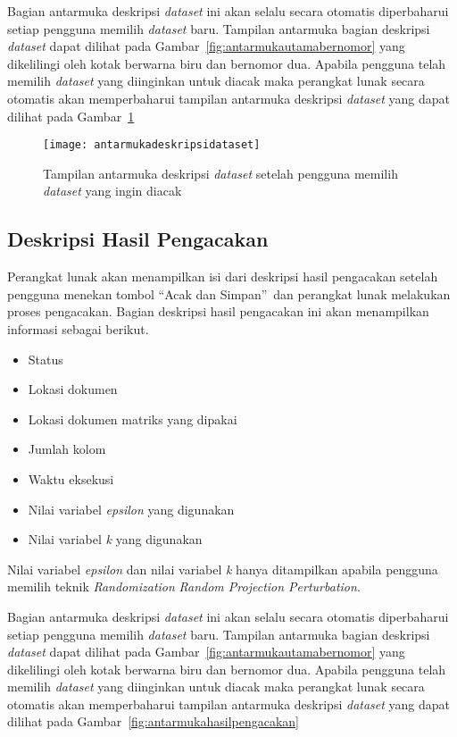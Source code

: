 Bagian antarmuka deskripsi \textit{dataset} ini akan selalu secara otomatis diperbaharui setiap pengguna memilih \textit{dataset} baru. Tampilan antarmuka bagian deskripsi \textit{dataset} dapat dilihat pada Gambar~\ref{fig:antarmukautamabernomor} yang dikelilingi oleh kotak berwarna biru dan bernomor dua. Apabila pengguna telah memilih \textit{dataset} yang diinginkan untuk diacak maka perangkat lunak secara otomatis akan memperbaharui tampilan antarmuka deskripsi \textit{dataset} yang dapat dilihat pada Gambar~\ref{fig:antarmukadeskripsidataset}

\begin{figure}
	\centering
	\texttt{[image: antarmukadeskripsidataset]}
	\caption{Tampilan antarmuka deskripsi \textit{dataset} setelah pengguna memilih \textit{dataset} yang ingin diacak}
	\label{fig:antarmukadeskripsidataset}
\end{figure}

\subsection{Deskripsi Hasil Pengacakan}
\label{subsec:deskripsihasil}

Perangkat lunak akan menampilkan isi dari deskripsi hasil pengacakan setelah pengguna menekan tombol \textquotedblleft Acak dan Simpan\textquotedblright~dan perangkat lunak melakukan proses pengacakan. Bagian deskripsi hasil pengacakan ini akan menampilkan informasi sebagai berikut. 
\begin{itemize}
	\item Status
	\item Lokasi dokumen
	\item Lokasi dokumen matriks yang dipakai
	\item Jumlah kolom
	\item Waktu eksekusi
	\item Nilai variabel \textit{epsilon} yang digunakan
	\item Nilai variabel \textit{k} yang digunakan
\end{itemize}
Nilai variabel \textit{epsilon} dan nilai variabel \textit{k} hanya ditampilkan apabila pengguna memilih teknik \textit{Randomization} \textit{Random Projection Perturbation}.

Bagian antarmuka deskripsi \textit{dataset} ini akan selalu secara otomatis diperbaharui setiap pengguna memilih \textit{dataset} baru. Tampilan antarmuka bagian deskripsi \textit{dataset} dapat dilihat pada Gambar~\ref{fig:antarmukautamabernomor} yang dikelilingi oleh kotak berwarna biru dan bernomor dua. Apabila pengguna telah memilih \textit{dataset} yang diinginkan untuk diacak maka perangkat lunak secara otomatis akan memperbaharui tampilan antarmuka deskripsi \textit{dataset} yang dapat dilihat pada Gambar~\ref{fig:antarmukahasilpengacakan}

